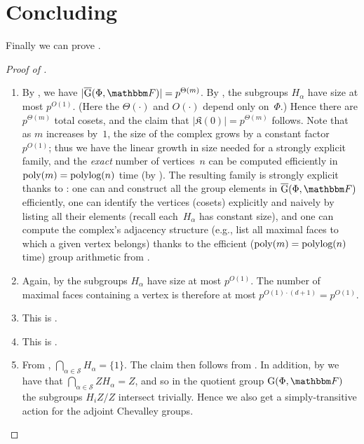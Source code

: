 \documentclass[10pt,a4paper]{article}
\theoremstyle{definition}
\newcommand{\poly}{\textnormal{poly}}
\newcommand{\polylog}{\textnormal{polylog}}
\newcommand{\F}{\mathbbm F}
\newcommand{\ol}[1]{\overline{#1}}
\newcommand{\calS}{\mathcal{S}}
\newcommand{\Esc}[2]{\ol{\mathrm{G}}(#1,#2)}
\newcommand{\G}[2]{\mathrm{G}(#1,#2)}
\newcommand{\complex}{\mathfrak{K}}
\begin{document}
\section{Concluding}
Finally we can prove .
\begin{proof}[Proof of ]
\quad
\begin{enumerate}
\item By , we have $|\Esc{\Phi}{\F}| = p^{\Theta(m)}$.
    By , the subgroups $H_\alpha$ have size at most $p^{O(1)}$.
    (Here the $\Theta(\cdot)$ and $O(\cdot)$ depend only on~$\Phi$.)
    Hence there are $p^{\Theta(m)}$ total cosets, and the claim that $|\complex(0)| = p^{\Theta(m)}$ follows.
    Note that as $m$ increases by~$1$, the size of the complex grows by a constant factor~$p^{O(1)}$; thus we have the linear growth in size needed for a strongly explicit family, and the \emph{exact} number of vertices~$n$ can be computed efficiently in $\poly(m) = \polylog(n)$ time (by ).  The resulting family is strongly explicit thanks to : one can and construct all the group elements in $\Esc{\Phi}{\F}$ efficiently, one can identify the vertices (cosets) explicitly and naively by listing all their elements (recall each~$H_\alpha$ has constant size), and one can compute the complex's adjacency structure (e.g., list all maximal faces to which a given vertex belongs) thanks to the efficient ($\poly(m) = \polylog(n)$ time) group arithmetic from .
\item Again, by  the subgroups $H_\alpha$ have size at most $p^{O(1)}$. The number of maximal faces containing a vertex is therefore at most $p^{O(1)\cdot (d+1)} = p^{O(1)}$.
\item This is .
\item This is .
\item From , $\bigcap_{\alpha \in \calS} H_\alpha = \{1\}$. The claim then follows from .  In addition, by  we have that $\bigcap_{\alpha \in \calS} Z H_\alpha = Z$, and so in the quotient group $\G{\Phi}{\F}$ the subgroups $H_i Z/Z$ intersect trivially. Hence we also get a simply-transitive action for the adjoint Chevalley groups.\qedhere
\end{enumerate}

\end{proof}
\end{document}
